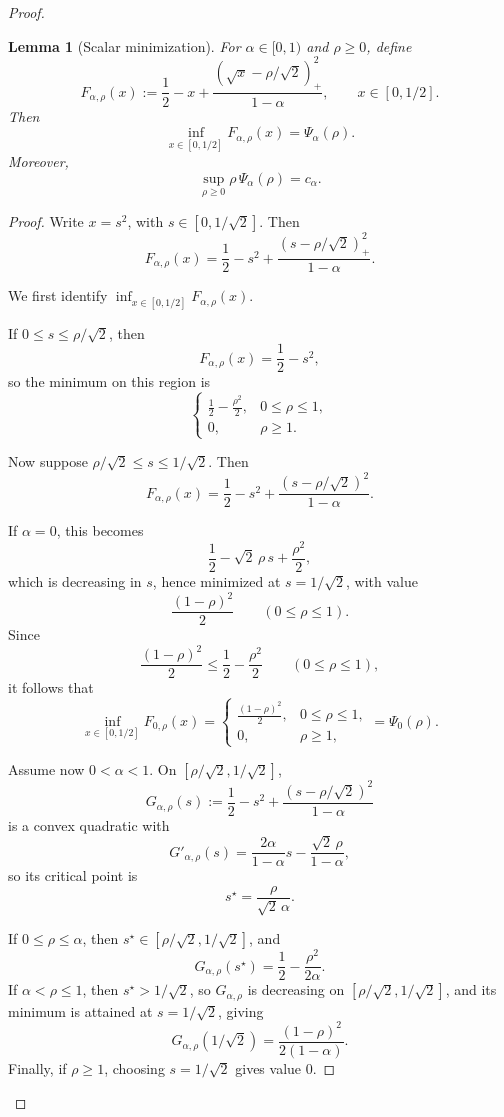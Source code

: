 \documentclass[conference]{IEEEtran}
\newtheorem{lemma}{Lemma}
\begin{document}
\begin{proof}[Proof]
\begin{lemma}[Scalar minimization]
\label{lem:scalar-min}
For \(\alpha\in[0,1)\) and \(\rho\ge 0\), define
\[
F_{\alpha,\rho}(x):=
\frac12-x+\frac{(\sqrt{x}-\rho/\sqrt2)_+^2}{1-\alpha},
\qquad x\in[0,1/2].
\]
Then
\[
\inf_{x\in[0,1/2]}F_{\alpha,\rho}(x)=\Psi_\alpha(\rho).
\]
Moreover,
\[
\sup_{\rho\ge 0}\rho\,\Psi_\alpha(\rho)=c_\alpha.
\]
\end{lemma}

\begin{proof}
Write \(x=s^2\), with \(s\in[0,1/\sqrt2]\). Then
\[
F_{\alpha,\rho}(x)
=
\frac12-s^2+\frac{(s-\rho/\sqrt2)_+^2}{1-\alpha}.
\]

We first identify \(\inf_{x\in[0,1/2]}F_{\alpha,\rho}(x)\).

If \(0\le s\le \rho/\sqrt2\), then
\[
F_{\alpha,\rho}(x)=\frac12-s^2,
\]
so the minimum on this region is
\[
\begin{cases}
\frac12-\frac{\rho^2}{2}, & 0\le \rho\le 1,\\[1ex]
0, & \rho\ge 1.
\end{cases}
\]

Now suppose \(\rho/\sqrt2\le s\le 1/\sqrt2\). Then
\[
F_{\alpha,\rho}(x)
=
\frac12-s^2+\frac{(s-\rho/\sqrt2)^2}{1-\alpha}.
\]

If \(\alpha=0\), this becomes
\[
\frac12-\sqrt2\,\rho\,s+\frac{\rho^2}{2},
\]
which is decreasing in \(s\), hence minimized at \(s=1/\sqrt2\), with value
\[
\frac{(1-\rho)^2}{2}
\qquad (0\le \rho\le 1).
\]
Since
\[
\frac{(1-\rho)^2}{2}\le \frac12-\frac{\rho^2}{2}
\qquad (0\le \rho\le 1),
\]
it follows that
\[
\inf_{x\in[0,1/2]}F_{0,\rho}(x)
=
\begin{cases}
\frac{(1-\rho)^2}{2}, & 0\le \rho\le 1,\\[1ex]
0, & \rho\ge 1,
\end{cases}
=
\Psi_0(\rho).
\]

Assume now \(0<\alpha<1\). On \([\rho/\sqrt2,1/\sqrt2]\),
\[
G_{\alpha,\rho}(s):=
\frac12-s^2+\frac{(s-\rho/\sqrt2)^2}{1-\alpha}
\]
is a convex quadratic with
\[
G'_{\alpha,\rho}(s)=\frac{2\alpha}{1-\alpha}s-\frac{\sqrt2\,\rho}{1-\alpha},
\]
so its critical point is
\[
s^\star=\frac{\rho}{\sqrt2\,\alpha}.
\]

If \(0\le \rho\le \alpha\), then \(s^\star\in[\rho/\sqrt2,1/\sqrt2]\), and
\[
G_{\alpha,\rho}(s^\star)=\frac12-\frac{\rho^2}{2\alpha}.
\]
If \(\alpha<\rho\le 1\), then \(s^\star>1/\sqrt2\), so \(G_{\alpha,\rho}\) is decreasing on \([\rho/\sqrt2,1/\sqrt2]\), and its minimum is attained at \(s=1/\sqrt2\), giving
\[
G_{\alpha,\rho}(1/\sqrt2)=\frac{(1-\rho)^2}{2(1-\alpha)}.
\]
Finally, if \(\rho\ge 1\), choosing \(s=1/\sqrt2\) gives value \(0\).


\end{proof}
\end{proof}
\end{document}
